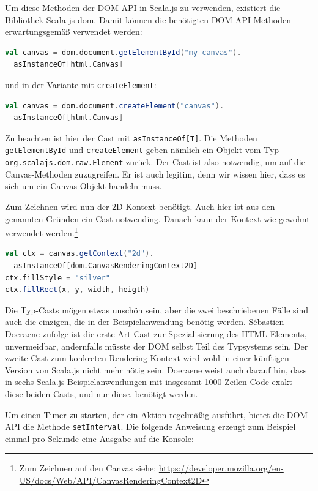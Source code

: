 \documentclass[a4paper, 12pt, hidelinks, listof=totoc, listoftables=totoc, bibliography=totoc]{scrreprt}
\begin{document}
Um diese Methoden der DOM-API in Scala.js zu verwenden, existiert die Bibliothek Scala-js-dom. Damit können die benötigten DOM-API-Methoden erwartungsgemäß verwendet werden:

\begin{lstlisting}[language=Scala]
val canvas = dom.document.getElementById("my-canvas").
  asInstanceOf[html.Canvas]
\end{lstlisting}

und in der Variante mit \texttt{createElement}:

\begin{lstlisting}[language=Scala]
val canvas = dom.document.createElement("canvas").
  asInstanceOf[html.Canvas]
\end{lstlisting}

Zu beachten ist hier der Cast mit \texttt{asInstanceOf[T]}. Die Methoden \texttt{getElementById} und \texttt{createElement}
geben nämlich ein Objekt vom Typ \texttt{org.scalajs.dom.raw.Element} zurück. Der Cast ist also notwendig, um auf die Canvas-Methoden zuzugreifen. Er ist auch legitim, denn wir wissen hier, dass es sich um ein Canvas-Objekt handeln muss.

Zum Zeichnen wird nun der 2D-Kontext benötigt. Auch hier ist aus den genannten Gründen ein Cast notwending. Danach kann der Kontext wie gewohnt verwendet werden.\footnote{Zum Zeichnen auf den Canvas siehe: \url{https://developer.mozilla.org/en-US/docs/Web/API/CanvasRenderingContext2D}}

\begin{lstlisting}[language=Scala]
val ctx = canvas.getContext("2d").
  asInstanceOf[dom.CanvasRenderingContext2D]
ctx.fillStyle = "silver"
ctx.fillRect(x, y, width, heigth)
\end{lstlisting}

Die Typ-Casts mögen etwas unschön sein, aber die zwei beschriebenen Fälle sind auch die einzigen, die in der Beispielanwendung benötig werden. Sébastien Doeraene zufolge ist die erste Art Cast zur Spezialisierung des HTML-Elements, unvermeidbar, andernfalls müsste der DOM selbst Teil des Typsystems sein. Der zweite Cast zum konkreten Rendering-Kontext wird wohl in einer künftigen Version von Scala.js nicht mehr nötig sein. Doeraene weist auch darauf hin, dass in sechs Scala.js-Beispielanwendungen mit insgesamt 1000 Zeilen Code exakt diese beiden Casts, und nur diese, benötigt werden.\cite[S. 8]{doeraene2013.TDI}

Um einen Timer zu starten, der ein Aktion regelmäßig ausführt, bietet die DOM-API die Methode \texttt{setInterval}. Die folgende Anweisung erzeugt zum Beispiel einmal pro Sekunde eine Ausgabe auf die Konsole:
\end{document}
